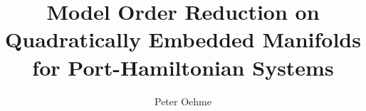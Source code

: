 

\author{Peter Oehme}
\title{Model Order Reduction on Quadratically Embedded Manifolds for Port-Hamiltonian Systems}


    \maketitle

    \tableofcontents

    
    
    
    

    \printbibliography[
        heading=bibintoc,
        title={Bibliography}
    ]
